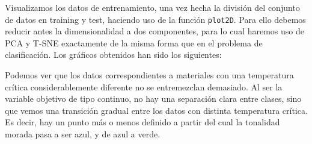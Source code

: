 \documentclass[a4]{article}
\begin{document}
Visualizamos los datos de entrenamiento, una vez hecha la división del conjunto de datos en training y test, haciendo uso de la función \lstinline|plot2D|. Para ello debemos reducir antes la dimensionalidad a dos componentes, para lo cual haremos uso de PCA y T-SNE exactamente de la misma forma que en el problema de clasificación. Los gráficos obtenidos han sido los siguientes: 

\begin{figure}[H]
	\centering    
	\caption{}
	\label{fig:dimreduction-r}
\end{figure}

Podemos ver que los datos correspondientes a materiales con una temperatura crítica considerablemente diferente no se entremezclan demasiado. Al ser la variable objetivo de tipo continuo, no hay una separación clara entre clases, sino que vemos una transición gradual entre los datos con distinta temperatura crítica. Es decir, hay un punto más o menos definido a partir del cual la tonalidad morada pasa a ser azul, y de azul a verde. 
\end{document}
